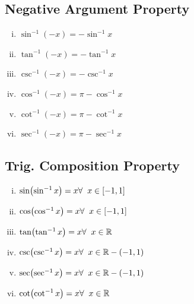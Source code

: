 \documentclass{article}
\begin{document}
\subsection{Negative Argument Property}
\begin{enumerate}[i.]
    \item $\sin^{-1}(-x)=-\sin^{-1}x$
    \item $\tan^{-1}(-x)=-\tan^{-1}x$ 
    \item $\csc^{-1}(-x)=-\csc^{-1}x$
    \item $\cos^{-1}(-x)=\pi - \cos^{-1}x$
    \item $\cot^{-1}(-x)=\pi - \cot^{-1}x$
    \item $\sec^{-1}(-x)=\pi - \sec^{-1}x$
\end{enumerate}

\subsection{Trig. Composition Property}
\begin{enumerate}[i.]
    \item $\sin(\sin^{-1}x)=x \hfill \forall \hspace{2mm} x \in [-1,1]$
    \item $\cos(\cos^{-1}x)=x \hfill \forall \hspace{2mm} x \in [-1,1]$
    \item $\tan(\tan^{-1}x)=x \hfill \forall \hspace{2mm} x \in \mathbb{R}$
    \item $\csc(\csc^{-1}x)=x \hfill \forall \hspace{2mm} x \in \mathbb{R}-(-1,1)$
    \item $\sec(\sec^{-1}x)=x \hfill \forall \hspace{2mm} x \in \mathbb{R}-(-1,1)$
    \item $\cot(\cot^{-1}x)=x \hfill \forall \hspace{2mm} x \in \mathbb{R}$
\end{enumerate}
\end{document}
